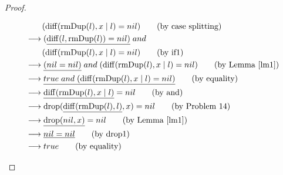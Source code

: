 \documentclass[12pt, a4paper]{article}
\newcommand{\rel}[1]{\mathrel{#1}}
\newcommand{\rmx}[1]{\mathrm{#1}}
\newcommand{\larrow}{\longrightarrow}
\newcommand{\under}{\underline}
\begin{document}
\begin{proof}
\begin{description}
\begin{align*}
	&\quad \quad (\rmx{diff}(\rmx{rmDup}(l), x \mid l) = nil) \tag{by case splitting} \\
	&\larrow (\under{\rmx{diff}(l, \rmx{rmDup}(l)) = nil)} \rel{and} \\
	&\quad \quad (\rmx{diff}(\rmx{rmDup}(l), x \mid l) = nil) \tag{by if1} \\
	&\larrow \under{(nil = nil)} \rel{and} (\rmx{diff}(\rmx{rmDup}(l), x \mid l) = nil) \tag{by Lemma~\ref{lm1}} \\
	&\larrow \under{true \rel{and} (\rmx{diff}(\rmx{rmDup}(l), x \mid l) = nil)} \tag{by equality} \\
	&\larrow \under{\rmx{diff}(\rmx{rmDup}(l), x \mid l)} = nil \tag{by and} \\
	&\larrow \rmx{drop}(\under{\rmx{diff}(\rmx{rmDup}(l), l)}, x) = nil \tag{by Problem 14} \\
	&\larrow \under{\rmx{drop}(nil, x)} = nil \tag{by Lemma~\ref{lm1}} \\
	&\larrow \under{nil = nil} \tag{by drop1} \\
	&\larrow true \tag{by equality}
\end{align*}


\end{description}
\end{proof}
\end{document}
